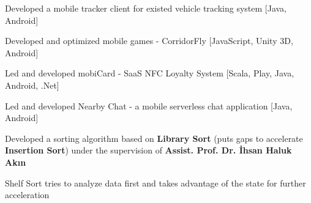 \documentclass[]{furkanvarol-resume}
\begin{document}
\begin{minipage}[t]{0.66\textwidth}
\descript{}
\begin{tightemize}
\item Developed a mobile tracker client for existed vehicle tracking system [Java, Android]
\item Developed and optimized mobile games - CorridorFly [JavaScript, Unity 3D, Android]
\item Led and developed mobiCard - SaaS NFC Loyalty System [Scala, Play, Java, Android, .Net]
\item Led and developed Nearby Chat - a mobile serverless chat application [Java, Android]
\end{tightemize}
\sectionsep


\begin{tightemize}
\item Developed a sorting algorithm based on \textbf{Library Sort} (puts gaps to accelerate \textbf{Insertion Sort}) under the supervision of \textbf{Assist. Prof. Dr. İhsan Haluk Akın}
\item Shelf Sort tries to analyze data first and takes advantage of the state for further acceleration
\end{tightemize}
\sectionsep

\end{minipage}
\end{document}
